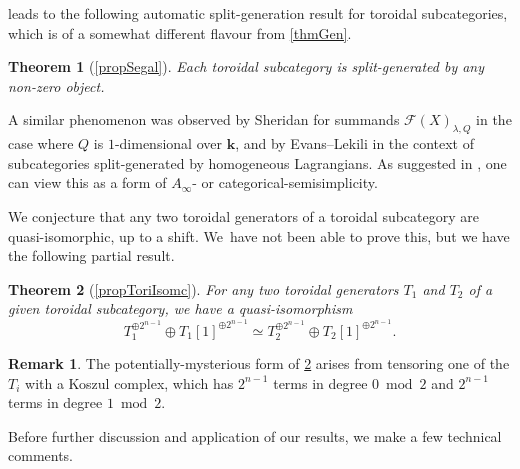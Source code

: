 \documentclass[JEP,XML,SOM,Unicode,NoEqCountersInSection,NoFloatCountersInSection,published]{cedram}
\newtheorem{mainthm}{Theorem}
\theoremstyle{definition}
\newtheorem{remark}[theorem]{Remark}
\newcommand{\Fuk}{\mathcal{F}}
\newcommand{\kk}{{\boldsymbol{k}}}
\begin{document}
 leads to the following automatic split-generation result for toroidal subcategories, which is of a somewhat different flavour from \cref{thmGen}.

\begin{mainthm}[\cref{propSegal}]
\label{TheoremD}
Each toroidal subcategory is split-generated by any non-zero object.
\end{mainthm}

A similar phenomenon was observed by Sheridan \cite[Cor.\,2.19]{SheridanFano} for summands $\Fuk(X)_{\lambda, Q}$ in the case where $Q$ is $1$-dimensional over $\kk$, and by Evans--Lekili \cite[Rem.\,1.2.3]{EvansLekiliGeneration} in the context of subcategories split-generated by homogeneous Lagrangians. As suggested in \cite[p.\,158]{EvansLekiliGeneration}, one can view this as a form of $A_\infty$- or categorical-semisimplicity.

We conjecture that any two toroidal generators of a toroidal subcategory are quasi-isomorphic, up to a shift. We~have not been able to prove this, but we have the following partial result.

\begin{mainthm}[\cref{propToriIsomc}]
\label{TheoremE}
For any two toroidal generators $T_1$ and $T_2$ of a given toroidal subcategory, we have a quasi-isomorphism
\[
T_1^{\oplus 2^{n-1}} \oplus T_1[1]^{\oplus 2^{n-1}} \simeq T_2^{\oplus 2^{n-1}} \oplus T_2[1]^{\oplus 2^{n-1}}.
\]
\end{mainthm}

\begin{remark}
The potentially-mysterious form of \cref{TheoremE} arises from tensoring one of the $T_i$ with a Koszul complex, which has $2^{n-1}$ terms in degree $0 \bmod 2$ and $2^{n-1}$ terms in degree $1 \bmod 2$.
\end{remark}

Before further discussion and application of our results, we make a few technical comments.
\end{document}
